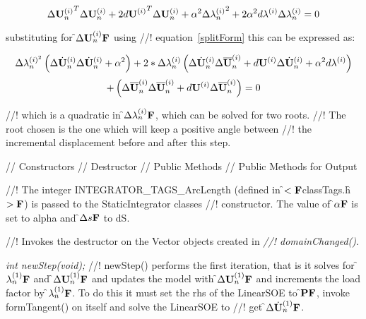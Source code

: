 \begin{enumerate}
\[
\Delta {{\bf U}_n^{(i)}}^T\Delta {\bf U}_n^{(i)} + 2{d{\bf U}^{(i)}}^T\Delta {\bf U}_n^{(i)} + 
\alpha^2 \Delta {\lambda_n^{(i)}}^2
+ 2 \alpha^2 d\lambda^{(i)} \Delta \lambda_n^{(i)} 
= 0
\]

\noindent substituting for \f$\Delta {{\bf U}_n^{(i)}} {\bf F}$ using
//! equation~\ref{splitForm} this can be expressed as:

\[
\Delta \lambda_n^{(i)^2} \left( \Delta \dot{\bf U}_n^{(i)} \Delta \dot{\bf U}_n^{(i)} +
\alpha^2 \right) +
2* \Delta \lambda_n^{(i)} \left( \Delta \dot{\bf U}_n^{(i)} \Delta \overline{\bf U}_n^{(i)}
+ d{\bf U}^{(i)} \Delta \dot{\bf U}_n^{(i)} 
+ \alpha^2d \lambda^{(i)} \right)
\]
\[
+ \left (\Delta \overline{\bf U}_n^{(i)} \Delta \overline{\bf U}_n^{(i)} + d{\bf U}^{(i)} \Delta
\overline{\bf U}_n^{(i)}
\right) =0 
\]

//! which is a quadratic in \f$\Delta \lambda_n^{(i)}{\bf F}$, which can be solved for two roots.
//! The root chosen is the one which will keep a positive angle between
//! the incremental displacement before and after this step.


\end{enumerate}
\indent // Constructors
\indent // Destructor
\indent // Public Methods
\indent // Public Methods for Output

//! The integer INTEGRATOR\_TAGS\_ArcLength (defined in
\f$<{\bf F}$classTags.h\f$>{\bf F}$) is passed to the StaticIntegrator classes
//! constructor. The value of \f$\alpha{\bf F}$ is set to \p alpha and 
\f$\Delta s{\bf F}$ to \p dS.

//! Invokes the destructor on the Vector objects created in {\em
//! domainChanged()}.


{\em int newStep(void);}
//! newStep() performs the first iteration, that is it solves for 
\f$\lambda_n^{(1)}{\bf F}$ and \f$\Delta {\bf U}_n^{(1)}{\bf F}$ and updates the model with
\f$\Delta {\bf U}_n^{(1)}{\bf F}$ and increments the load factor by
\f$\lambda_n^{(1)}{\bf F}$. To do this it must set the rhs of the LinearSOE to
\f${\bf P}{\bf F}$, invoke formTangent() on itself and solve the LinearSOE to
//! get \f$\Delta \dot{\bf U}_n^{(1)}{\bf F}$.

